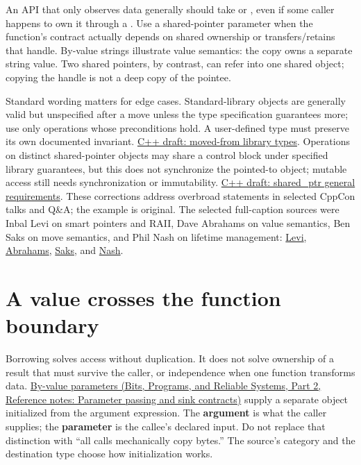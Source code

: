 An API that only observes data generally should take  or , even if some caller happens to own it through a . Use a shared-pointer parameter when the function's contract actually depends on shared ownership or transfers/retains that handle. By-value strings illustrate value semantics: the copy owns a separate string value. Two shared pointers, by contrast, can refer into one shared object; copying the handle is not a deep copy of the pointee.

Standard wording matters for edge cases. Standard-library objects are generally valid but unspecified after a move unless the type specification guarantees more; use only operations whose preconditions hold. A user-defined type must preserve its own documented invariant. \href{https://eel.is/c++draft/lib.types.movedfrom}{C++ draft: moved-from library types}. Operations on distinct shared-pointer objects may share a control block under specified library guarantees, but this does not synchronize the pointed-to object; mutable access still needs synchronization or immutability. \href{https://eel.is/c++draft/util.smartptr.shared}{C++ draft: shared\_ptr general requirements}. These corrections address overbroad statements in selected CppCon talks and Q\&A; the example is original. The selected full-caption sources were Inbal Levi on smart pointers and RAII, Dave Abrahams on value semantics, Ben Saks on move semantics, and Phil Nash on lifetime management: \href{https://www.youtube.com/watch?v=07rJOzFRs6M}{Levi}, \href{https://www.youtube.com/watch?v=QthAU-t3PQ4}{Abrahams}, \href{https://www.youtube.com/watch?v=szU5b972F7E}{Saks}, and \href{https://www.youtube.com/watch?v=aMvIv6blzBs}{Nash}.

\section{A value crosses the function boundary}\label{05-engine-i-ch003-a-value-crosses-the-function-boundary}

\hypertarget{05-engine-i-ch003-a-value-crosses-the-function-boundary}{}

Borrowing solves access without duplication. It does not solve ownership of a result that must survive the caller, or independence when one function transforms data. \href{../01-Bits-Programs-and-Reliable-Systems-P02/main.pdf\#appendix-d5908f75721f}{By-value parameters (Bits, Programs, and Reliable Systems, Part 2, Reference notes: Parameter passing and sink contracts)} supply a separate object initialized from the argument expression. The \textbf{argument} is what the caller supplies; the \textbf{parameter} is the callee's declared input. Do not replace that distinction with ``all calls mechanically copy bytes.'' The source's category and the destination type choose how initialization works.

